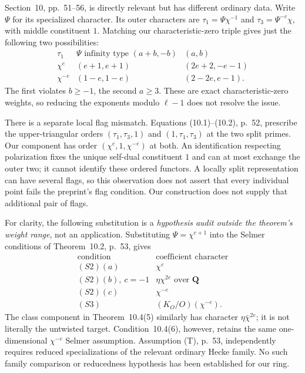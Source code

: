 \documentclass[11pt,a4paper]{article}
\theoremstyle{definition}
\begin{document}
Section~10, pp.~51--56, is directly relevant but has
different ordinary data.  Write $\Psi$ for its
specialized character.  Its outer characters are
$\tau_1=\Psi\chi^{-1}$ and
$\tau_3=\Psi^{-c}\chi$, with middle constituent $1$.
Matching our characteristic-zero triple gives just
the following two possibilities:
\[
 \begin{array}{c|c|c}
 \tau_1&\Psi\text{ infinity type }(a+b,-b)&(a,b)\\ \hline
 \chi^e&(e+1,e+1)&(2e+2,-e-1)\\
 \chi^{-e}&(1-e,1-e)&(2-2e,e-1).
 \end{array}                                                \tag{RC.4}
\]
The first violates $b\geq-1$, the second $a\geq3$.
These are exact characteristic-zero weights, so reducing
the exponents modulo $\ell-1$ does not resolve the issue.

There is a separate local flag mismatch.  Equations
(10.1)--(10.2), p.~52, prescribe the upper-triangular
orders $(\tau_1,\tau_3,1)$ and $(1,\tau_1,\tau_3)$ at
the two split primes.  Our component has order
$(\chi^e,1,\chi^{-e})$ at both.  An identification
respecting polarization fixes the unique self-dual
constituent $1$ and can at most exchange the outer two;
it cannot identify these ordered functors.  A locally
split representation can have several flags, so this
observation does not assert that every individual point
fails the preprint's flag condition.  Our construction
does not supply that additional pair of flags.

For clarity, the following substitution is a
\emph{hypothesis audit outside the theorem's weight
range}, not an application.  Substituting
$\Psi=\chi^{e+1}$ into the Selmer conditions of
Theorem~10.2, p.~53, gives
\[
 \begin{array}{c|c}
 \text{condition}&\text{coefficient character}\\ \hline
 (S2)(a)&\chi^e\\
 (S2)(b),\ c=-1&\eta\chi^{2e}\text{ over }\mathbf Q\\
 (S2)(c)&\chi^{-e}\\
 (S3)&(K_O/O)(\chi^{-e}).
 \end{array}                                                \tag{RC.5}
\]
The class component in Theorem~10.4(5) similarly has
character $\eta\bar\chi^{2e}$; it is not literally the
untwisted target.  Condition~10.4(6), however, retains
the same one-dimensional $\chi^{-e}$ Selmer assumption.
Assumption (T), p.~53, independently requires reduced
specializations of the relevant ordinary Hecke family.
No such family comparison or reducedness hypothesis has
been established for our ring.
\end{document}
